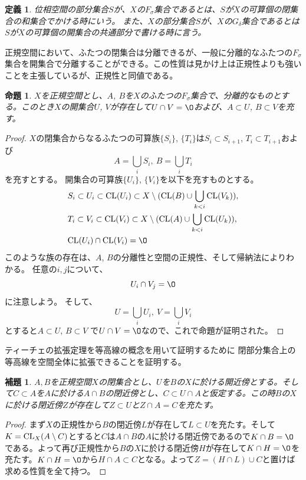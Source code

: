 \documentclass[leqno]{jsarticle}
\newtheorem{prop}[thm]{命題}
\newtheorem{lem}[thm]{補題}
\newtheorem{df}[thm]{定義}
\newcommand{\cl}{\text{{\rm CL}} }
\begin{document}
\begin{df}
位相空間の部分集合$S$が、$X$の$F_{\sigma}$集合であるとは、$S$が$X$の可算個の閉集合の和集合でかける時にいう。
また、$X$の部分集合$S$が、$X$の$G_{\delta}$集合であるとは$S$が$X$の可算個の開集合の共通部分で書ける時に言う。
\end{df}
正規空間において、ふたつの閉集合は分離できるが、一般に分離的なふたつの$F_{\sigma}$集合を開集合で分離することができる。この性質は見かけ上は正規性よりも強いことを主張しているが、正規性と同値である。
\begin{prop}\label{efsigma}
$X$を正規空間とし、$A$, $B$を$X$のふたつの$F_{\sigma}$集合で、分離的なものとする。このとき$X$の開集合$U$, $V$が存在して$U\cap V=\O$および、$A\subset U$, $B\subset V$を充す。
\end{prop}
\begin{proof}
$X$の閉集合からなるふたつの可算族$\{S_i\}$, $\{T_i\}$は$S_i\subset S_{i+1}$, $T_i\subset T_{i+1}$および
\[
A=\bigcup_i S_i, \ B=\bigcup_i T_i
\]
を充すとする。
開集合の可算族$\{U_i\}$, $\{V_i\}$を以下を充すものとする。
\setcounter{equation}{0}
\begin{align}
&S_i\subset U_i\subset \cl(U_i)\subset X\setminus(\cl(B)\cup \bigcup_{k<i}\cl(V_k)), \\
&T_i \subset V_i\subset \cl(V_i)\subset X\setminus(\cl(A)\cup \bigcup_{k<i}\cl(U_k)), \\ 
&\cl(U_i)\cap \cl(V_i)=\O
\end{align}
このような族の存在は、$A$, $B$の分離性と空間の正規性、そして帰納法によりわかる。
任意の$i,j$について、
\[
U_i\cap V_j=\O
\]
に注意しよう。
そして、
\[
U=\bigcup_iU_i, \ V=\bigcup_iV_i
\]
とすると$A\subset U$, $B\subset V$
で$U\cap V=\O$なので、これで命題が証明された。
\end{proof}

ティーチェの拡張定理を等高線の概念を用いて証明するために
閉部分集合上の等高線を空間全体に拡張できることを証明する。

\begin{lem}\label{cc}
$A,B$を正規空間$X$の閉集合とし、$U$を$B$の$X$に於ける開近傍とする。そして$C\subset A$を$A$に於ける$A\cap B$の閉近傍とし、$C\subset U\cap A$と仮定する。この時$B$の$X$に於ける閉近傍$Z$が存在して$Z\subset U$と$Z\cap A=C$を充たす。
\end{lem}
\begin{proof}
まず$X$の正規性から$B$の閉近傍$L$が存在して$L\subset U$を充たす。そして
$K=\cl_X(A\setminus C)$とすると$C$は$A\cap B$の$A$に於ける閉近傍であるので$K\cap B=\O$である。よって再び正規性から$B$の$X$に於ける閉近傍$H$が存在して$K\cap H=\O$を充たす。$K\cap H=\O$から$H\cap A\subset C$となる。よって$Z=(H\cap L)\cup C$と置けば求める性質を全て持つ。
\end{proof}
\end{document}
